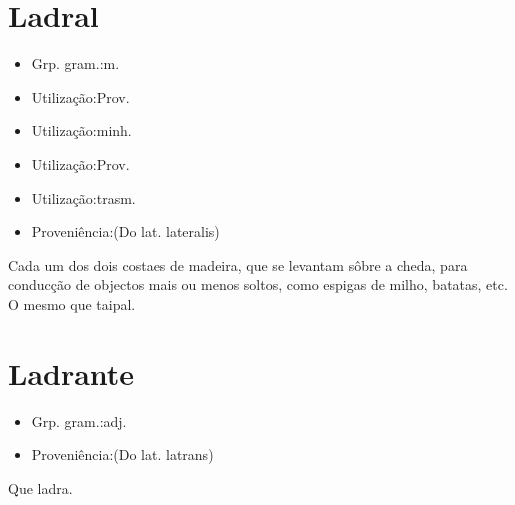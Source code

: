 \section{Ladral}
\begin{itemize}
\item {Grp. gram.:m.}
\end{itemize}
\begin{itemize}
\item {Utilização:Prov.}
\end{itemize}
\begin{itemize}
\item {Utilização:minh.}
\end{itemize}
\begin{itemize}
\item {Utilização:Prov.}
\end{itemize}
\begin{itemize}
\item {Utilização:trasm.}
\end{itemize}
\begin{itemize}
\item {Proveniência:(Do lat. \textunderscore lateralis\textunderscore )}
\end{itemize}
Cada um dos dois costaes de madeira, que se levantam sôbre a cheda, para conducção de objectos mais ou menos soltos, como espigas de milho, batatas, etc.
O mesmo que \textunderscore taipal\textunderscore .
\section{Ladrante}
\begin{itemize}
\item {Grp. gram.:adj.}
\end{itemize}
\begin{itemize}
\item {Proveniência:(Do lat. \textunderscore latrans\textunderscore )}
\end{itemize}
Que ladra.
